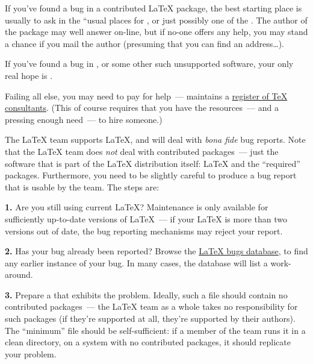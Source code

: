 If you've found a bug in a contributed \LaTeX{} package, the best
starting place is usually to ask in the ``usual places for %
, or just possibly one of the %
.
The author of the package may well answer on-line, but if no-one
offers any help, you may stand a chance if you mail the author
(presuming that you can find an address\dots{}).

If you've found a bug in \LaTeXo{}, or some other such unsupported
software, your only real hope is .

Failing all else, you may need to pay for
help~---  maintains a %
\href{http://www.tug.org/consultants.html}{register of \TeX{} consultants}.
(This of course requires that you have the resources~--- and a
pressing  enough need~--- to hire someone.)


\htmlignore
\par
\endhtmlignore
{}
\htmlignore
\par
\endhtmlignore
%
\label{lastquestion}

The \LaTeX{} team supports \LaTeX{}, and will deal with
\emph{bona fide} bug reports.  Note that the \LaTeX{} team does
\emph{not} deal with contributed packages~--- just the software that
is part of the \LaTeX{} distribution itself: \LaTeX{} and the
``required'' packages.
Furthermore, you need to be slightly
careful to produce a bug report that is usable by the team.  The steps
are:

\nothtml{\noindent}\textbf{1.} Are you still using current \LaTeX{}?  Maintenance is only
available for sufficiently up-to-date versions of \LaTeX{}~--- if your
\LaTeX{} is more than two versions out of date, the bug reporting
mechanisms may reject your report.

\nothtml{\noindent}\textbf{2.} Has your bug already been reported?  Browse the
\href{http://www.latex-project.org/cgi-bin/ltxbugs2html?introduction=yes}{\LaTeX{} bugs database},
to find any earlier instance of your bug.  In many cases, the database
will list a work-around.

\nothtml{\noindent}\textbf{3.} Prepare a %
 that exhibits the problem.
Ideally, such a file should contain no contributed packages~--- the
\LaTeX{} team as a whole takes no responsibility for such packages (if
they're supported at all, they're supported by their authors).  The
``minimum'' file should be self-sufficient: if a member of the team
runs it in a clean directory, on a system with no contributed
packages, it should replicate your problem.

